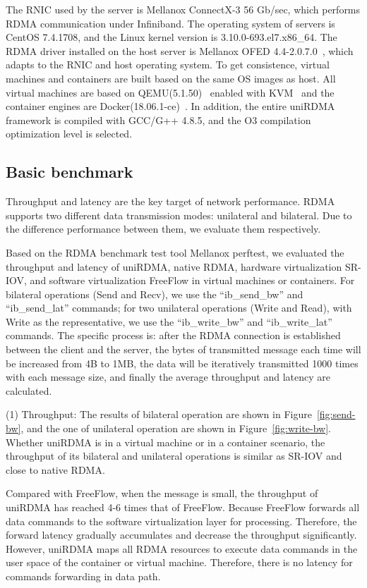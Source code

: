 The RNIC used by the server is Mellanox ConnectX-3 56 Gb/sec, which performs RDMA communication under Infiniband. The operating system of servers is CentOS 7.4.1708, and the Linux kernel version is 3.10.0-693.el7.x86\_64. The RDMA driver installed on the host server is Mellanox OFED 4.4-2.0.7.0~\cite{mlnx-ofed}, which adapts to the RNIC and host operating system. To get consistence, virtual machines and containers are built based on the same OS images as host. All virtual machines are based on QEMU(5.1.50)~\cite{qemu} enabled with KVM~\cite{kvm} and the container engines are Docker(18.06.1-ce)~\cite{docker}. In addition, the entire uniRDMA framework is compiled with GCC/G++ 4.8.5, and the O3 compilation optimization level is selected. 

\subsection{Basic benchmark}
Throughput and latency are the key target of network performance. RDMA supports two different data transmission modes: unilateral and bilateral. Due to the difference performance between them, we evaluate them respectively.

Based on the RDMA benchmark test tool Mellanox perftest, we evaluated the throughput and latency of uniRDMA, native RDMA, hardware virtualization SR-IOV, and software virtualization FreeFlow in virtual machines or containers. For bilateral operations (Send and Recv), we use the ``ib\_send\_bw'' and ``ib\_send\_lat'' commands; for two unilateral operations (Write and Read), with Write as the representative, we use the ``ib\_write\_bw'' and ``ib\_write\_lat'' commands. The specific process is: after the RDMA connection is established between the client and the server, the bytes of transmitted message each time will be increased from 4B to 1MB, the data will be iteratively transmitted 1000 times with each message size, and finally the average throughput and latency are calculated.

(1) Throughput: The results of bilateral operation are shown in Figure~\ref{fig:send-bw}, and the one of unilateral operation are shown in Figure~\ref{fig:write-bw}. Whether uniRDMA is in a virtual machine or in a container scenario, the throughput of its bilateral and unilateral operations is similar as SR-IOV and close to native RDMA.

Compared with FreeFlow, when the message is small, the throughput of uniRDMA has reached 4-6 times that of FreeFlow. Because FreeFlow forwards all data commands to the software virtualization layer for processing. Therefore, the forward latency gradually accumulates and decrease the throughput significantly. However, uniRDMA maps all RDMA resources to execute data commands in the user space of the container or virtual machine. Therefore, there is no latency for commands forwarding in data path.

